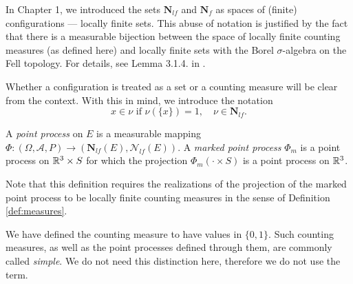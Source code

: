 

\begin{remark}\label{r:abuse}
	In Chapter 1, we introduced the sets $\mathbf N_{lf}$ and $\mathbf N_f$ as spaces of (finite) configurations --- locally finite sets. This abuse of notation is justified by the fact that there is a measurable bijection between the space of locally finite counting measures (as defined here) and locally finite sets with the Borel $\sigma$-algebra on the Fell topology. For details, see Lemma 3.1.4. in \cite{SchneiderWeil2008}.   

	Whether a configuration is treated as a set or a counting measure will be clear from the context. With this in mind, we introduce the notation 
	$$x\in \nu \text{ if } \nu(\{x\})=1, \quad \nu \in \mathbf N_{lf}.$$
\end{remark}

\begin{definition}
A \textit{point process} on $E$ is a measurable mapping $\Phi:(\Omega,\mathcal A, P) \to (\mathbf N_{lf}(E),\mathcal N_{lf}(E))$. \newline
A \textit{marked point process} $\Phi_m$ is a point process on ${\mathbb R^3}\times S$ for which the projection $\Phi_m(\cdot \times S)$ is a point process on ${\mathbb R^3}$.
\end{definition}
Note that this definition requires the realizations of the projection of the marked point process to be locally finite counting measures in the sense of Definition \ref{def:measures}.

\begin{remark}
	We have defined the counting measure to have values in $\{0,1\}$. Such counting measures, as well as the point processes defined through them, are commonly called \textit{simple}. We do not need this distinction here, therefore we do not use the term.
\end{remark}


